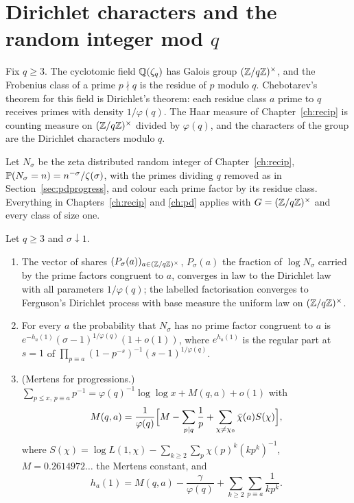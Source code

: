 \section{Dirichlet characters and the random integer mod \texorpdfstring{$q$}{q}}\label{sec:gl1dirichlet}

Fix $q\ge3$. The cyclotomic field $\mathbb{Q}(\zeta_q)$ has Galois group $(\mathbb{Z}/q\mathbb{Z})^\times$, and the Frobenius class of a prime $p\nmid q$ is the residue of $p$ modulo $q$. Chebotarev's theorem for this field is Dirichlet's theorem: each residue class $a$ prime to $q$ receives primes with density $1/\varphi(q)$. The Haar measure of Chapter~\ref{ch:recip} is counting measure on $(\mathbb{Z}/q\mathbb{Z})^\times$ divided by $\varphi(q)$, and the characters of the group are the Dirichlet characters modulo $q$.

Let $N_\sigma$ be the zeta distributed random integer of Chapter~\ref{ch:recip}, $\mathbb{P}(N_\sigma=n)=n^{-\sigma}/\zeta(\sigma)$, with the primes dividing $q$ removed as in Section~\ref{sec:pdprogress}, and colour each prime factor by its residue class. Everything in Chapters~\ref{ch:recip} and \ref{ch:pd} applies with $G=(\mathbb{Z}/q\mathbb{Z})^\times$ and every class of size one.

\begin{theorem}\label{thm:gl1dirichlet}
Let $q\ge3$ and $\sigma\downarrow1$.
\begin{enumerate}
\item[(i)] The vector of shares $(P_\sigma(a))_{a\in(\mathbb{Z}/q\mathbb{Z})^\times}$, $P_\sigma(a)$ the fraction of $\log N_\sigma$ carried by the prime factors congruent to $a$, converges in law to the Dirichlet law with all parameters $1/\varphi(q)$; the labelled factorisation converges to Ferguson's Dirichlet process with base measure the uniform law on $(\mathbb{Z}/q\mathbb{Z})^\times$.
\item[(ii)] For every $a$ the probability that $N_\sigma$ has no prime factor congruent to $a$ is $e^{-h_a(1)}(\sigma-1)^{1/\varphi(q)}(1+o(1))$, where $e^{h_a(1)}$ is the regular part at $s=1$ of $\prod_{p\equiv a}(1-p^{-s})^{-1}(s-1)^{1/\varphi(q)}$.
\item[(iii)] (Mertens for progressions.) $\sum_{p\le x,\,p\equiv a}p^{-1}=\varphi(q)^{-1}\log\log x+M(q,a)+o(1)$ with
\[
M(q,a)=\frac1{\varphi(q)}\Bigl[M-\sum_{p\mid q}\frac1p+\sum_{\chi\ne\chi_0}\bar\chi(a)S(\chi)\Bigr],
\]
where $S(\chi)=\log L(1,\chi)-\sum_{k\ge2}\sum_p\chi(p)^k(kp^{k})^{-1}$,
$M=0.2614972\ldots$ the Mertens constant, and
\[
h_a(1)=M(q,a)-\frac{\gamma}{\varphi(q)}+\sum_{k\ge2}\sum_{p\equiv a}\frac1{kp^k}.
\]
\end{enumerate}
\end{theorem}

